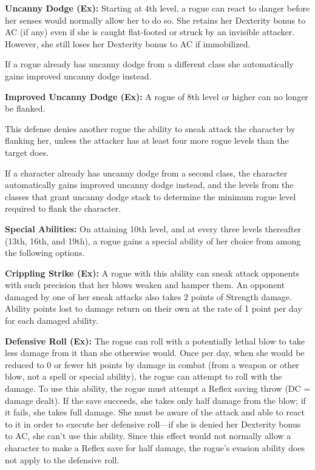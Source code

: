\textbf{Uncanny Dodge (Ex):} Starting at 4th level, a rogue can react to danger before her senses would normally allow her to do so. She retains her Dexterity bonus to AC (if any) even if she is caught flat-footed or struck by an invisible attacker. However, she still loses her Dexterity bonus to AC if immobilized.

If a rogue already has uncanny dodge from a different class she automatically gains improved uncanny dodge instead.

\textbf{Improved Uncanny Dodge (Ex):} A rogue of 8th level or higher can no longer be flanked.

This defense denies another rogue the ability to sneak attack the character by flanking her, unless the attacker has at least four more rogue levels than the target does.

If a character already has uncanny dodge from a second class, the character automatically gains improved uncanny dodge instead, and the levels from the classes that grant uncanny dodge stack to determine the minimum rogue level required to flank the character.

\textbf{Special Abilities:} On attaining 10th level, and at every three levels thereafter (13th, 16th, and 19th), a rogue gains a special ability of her choice from among the following options.

\textbf{Crippling Strike (Ex):} A rogue with this ability can sneak attack opponents with such precision that her blows weaken and hamper them. An opponent damaged by one of her sneak attacks also takes 2 points of Strength damage. Ability points lost to damage return on their own at the rate of 1 point per day for each damaged ability.

\textbf{Defensive Roll (Ex):} The rogue can roll with a potentially lethal blow to take less damage from it than she otherwise would. Once per day, when she would be reduced to 0 or fewer hit points by damage in combat (from a weapon or other blow, not a spell or special ability), the rogue can attempt to roll with the damage. To use this ability, the rogue must attempt a Reflex saving throw (DC = damage dealt). If the save succeeds, she takes only half damage from the blow; if it fails, she takes full damage. She must be aware of the attack and able to react to it in order to execute her defensive roll—if she is denied her Dexterity bonus to AC, she can’t use this ability. Since this effect would not normally allow a character to make a Reflex save for half damage, the rogue’s evasion ability does not apply to the defensive roll.


